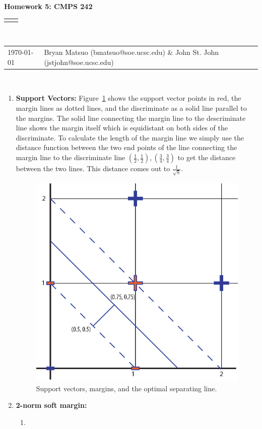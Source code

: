 \documentclass[12pt]{article}
\renewcommand{\title}[1]{\textbf{#1}\\}
\renewcommand{\line}{\begin{tabularx}{\textwidth}{X>{\raggedleft}X}\hline\\\end{tabularx}\\[-0.5cm]}
\newcommand{\leftright}[2]{\begin{tabularx}{\textwidth}{X>{\raggedleft}X}#1%
& #2\\\end{tabularx}\\[-0.5cm]}
\begin{document}
\title{Homework 5: CMPS 242}
\line
\leftright{\today}{Bryan Matsuo (bmatsuo@soe.ucsc.edu) \& John St. John (jstjohn@soe.ucsc.edu)} %
\begin{enumerate}
\item \textbf{Support Vectors:}
Figure~\ref{fig:vector} shows the support vector points in red, the margin lines as dotted lines, and the discriminate as a solid line parallel to the margins. The solid line connecting the margin line to the descriminate line shows the margin itself which is equidistant on both sides of the discriminate. To calculate the length of the margin line we simply use the distance function between the two end points of the line connecting the margin line to the discriminate line $\left(\frac{1}{2},\frac{1}{2}\right),\left(\frac{3}{4},\frac{3}{4}\right)$ to get the distance between the two lines. This distance comes out to $\frac{1}{\sqrt{8}}$.

\begin{figure}[htbp]
\begin{center}
\includegraphics[scale=1]{supportvectors.eps}
\caption{Support vectors, margins, and the optimal separating line.}
\label{fig:vector}
\end{center}
\end{figure}



\item \textbf{2-norm soft margin: }
\begin{enumerate}
\item %
\end{enumerate}
\end{enumerate}
\end{document}
